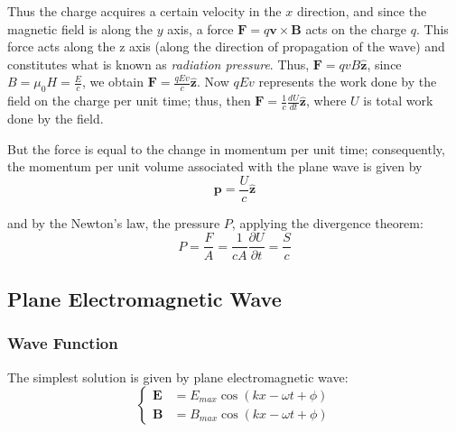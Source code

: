 \documentclass[openany]{book}
\begin{document}
Thus the charge acquires a certain velocity in the $x$ direction, and since the magnetic field is along the $y$ axis, a force $\mathbf{F}=q\mathbf{v}\times \mathbf{B}$ acts on the charge $q$. This force acts along the z axis (along the direction of propagation of the wave) and constitutes what is known as \emph{radiation pressure}. Thus, $\mathbf{F}=qvB\hat{\mathbf{z}}$, since $B=\mu _0H=\frac{E}{c}$, we obtain $\mathbf{F}=\frac{qEv}{c}\hat{\mathbf{z}}$. Now $qEv$ represents the work done by the field on the charge per unit time; thus, then $\mathbf{F}=\frac{1}{c}\frac{dU}{dt}\hat{\mathbf{z}}$, where $U$ is total work done by the field.

But the force is equal to the change in momentum per unit time; consequently, the momentum per unit volume associated with the plane wave is given by
\[\mathbf{p}=\frac{U}{c}\hat{\mathbf{z}}\]

and by the Newton's law, the pressure $P$, applying the divergence theorem:
\[P=\frac{F}{A}=\frac{1}{cA}\frac{\partial U}{\partial t}=\frac{S}{c}\]
\subsection{Plane Electromagnetic Wave}
\subsubsection{Wave Function}
The simplest solution is given by plane electromagnetic wave:
\[ \begin{cases}
\mathbf{E}&=E_{max}\cos (kx-\omega t+\phi)\\
\mathbf{B}&=B_{max}\cos (kx-\omega t+\phi)
\end{cases} \]
\end{document}
